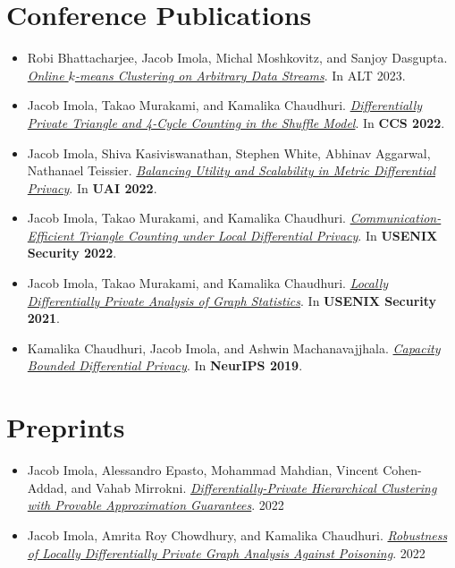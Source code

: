 \documentclass[11pt]{article}
\begin{document}
\section*{Conference Publications}
\begin{itemize}
	\setlength\itemsep{-0.3em}
	\item 
		Robi Bhattacharjee, Jacob Imola, Michal Moshkovitz, and Sanjoy Dasgupta.
		\textit{\href{https://arxiv.org/abs/2102.09101}{Online $k$-means Clustering on Arbitrary Data Streams}}. In ALT 2023.
	\item Jacob Imola, Takao Murakami, and Kamalika Chaudhuri.
		\textit{\href{https://arxiv.org/abs/2205.01429.pdf}{Differentially Private Triangle and 4-Cycle Counting in the Shuffle Model}}. In \textbf{CCS 2022}. 
	\item Jacob Imola, Shiva Kasiviswanathan, Stephen White, Abhinav Aggarwal, Nathanael Teissier.
		\textit{\href{https://openreview.net/pdf?id=B0l8-wLjql5}{Balancing Utility and Scalability in Metric Differential Privacy}}. In \textbf{UAI 2022}.
	\item 
		Jacob Imola, Takao Murakami, and Kamalika Chaudhuri.
		\textit{\href{https://arxiv.org/abs/2110.06485}{Communication-Efficient Triangle Counting under Local Differential Privacy}}. In \textbf{USENIX Security 2022}.
	\item 
		Jacob Imola, Takao Murakami, and Kamalika Chaudhuri.
		\textit{\href{https://arxiv.org/abs/2010.08688}{Locally Differentially Private Analysis of Graph Statistics}}. In \textbf{USENIX Security 2021}.
	\item
		Kamalika Chaudhuri, Jacob Imola, and Ashwin Machanavajjhala.
		\textit{\href{https://arxiv.org/abs/1907.02159}{Capacity Bounded Differential Privacy}}.
	  In \textbf{NeurIPS 2019}.
\end{itemize}

\section*{Preprints}
\begin{itemize}
	\setlength\itemsep{-0.3em}
	\item
	Jacob Imola, Alessandro Epasto, Mohammad Mahdian, Vincent Cohen-Addad, and Vahab Mirrokni.
	\textit{\href{https://arxiv.org/abs/2302.00037}{Differentially-Private Hierarchical Clustering with Provable Approximation Guarantees}}. 2022
	\item
		Jacob Imola, Amrita Roy Chowdhury, and Kamalika Chaudhuri.
		\textit{\href{https://arxiv.org/pdf/2210.14376.pdf}{Robustness of Locally Differentially Private Graph Analysis Against Poisoning}}. 2022
\end{itemize}
\end{document}
